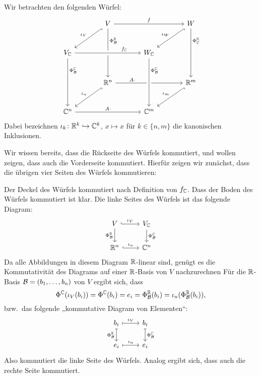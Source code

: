 \documentclass[a4paper,10pt]{article}
\begin{document}
Wir betrachten den folgenden Würfel:
\[
  \begin{tikzcd}[row sep = large, column sep = large]
      {}
    & V
      \arrow[rr, "f"]
      \arrow[ld, hookrightarrow, "\iota_V"']
      \arrow[dd, "\Phi^\Rbb_\mc{B}" near start]
    & 
    & W
      \arrow[ld, hookrightarrow, "\iota_W"']
      \arrow[dd, "\Phi^\Rbb_\mc{C}", near start]
    \\
      V_\Cbb
      \arrow[rr, crossing over, "f_\Cbb" near end]
      \arrow[dd, "\Phi^\Cbb_\mc{B}" near start]
    & 
    & W_\Cbb
    & 
    \\
      {}
    & \Rbb^n
      \arrow[ld, hookrightarrow, "\iota_n"']
      \arrow[rr, "A \cdot" near start]
    & 
    & \Rbb^m
      \arrow[ld, hookrightarrow, "\iota_m"']
    \\
      \Cbb^n
      \arrow[rr, "A \cdot"]
    & 
    & \Cbb^m
      \arrow[from=uu, crossing over, "\Phi^\Cbb_\mc{B}" near start]
    & 
  \end{tikzcd}
\]
Dabei bezeichnen $\iota_k \colon \mathbb{R}^k \hookrightarrow \mathbb{C}^k$, $x \mapsto x$ für $k \in \{n, m\}$ die kanonischen Inklusionen.

Wir wissen bereits, dass die Rückseite des Würfels kommutiert, und wollen zeigen, dass auch die Vorderseite kommutiert.
Hierfür zeigen wir zunächst, dass die übrigen vier Seiten des Würfels kommutieren:

Der Deckel des Würfels kommutiert nach Definition von $f_{\mathbb{C}}$.
Dass der Boden des Würfels kommutiert ist klar.
Die linke Seites des Würfels ist das folgende Diagram:
\[
  \begin{tikzcd}
      V
      \arrow[r, hookrightarrow, "\iota_V"]
      \arrow[d, "\Phi^\Rbb_\mc{B}"']
    & V_\Cbb
      \arrow[d, "\Phi^\Cbb_\mc{B}"]
    \\
      \Rbb^n
      \arrow[r, hookrightarrow, "\iota_n"]
    & \Cbb^n
  \end{tikzcd}
\]
Da alle Abbildungen in diesem Diagram $\mathbb{R}$-linear sind, genügt es die Kommutativität des Diagrams auf einer $\mathbb{R}$-Basis von $V$ nachzurechnen
Für die $\mathbb{R}$-Basis $\mathcal{B} = (b_1, \dotsc, b_n)$ von $V$ ergibt sich, dass
\[
  \Phi^{\mathbb{C}}(\iota_V(b_i))
  = \Phi^{\mathbb{C}}(b_i)
  = e_i
  = \Phi^{\mathbb{R}}_{\mathcal{B}}(b_i)
  = \iota_n(\Phi^{\mathbb{R}}_{\mathcal{B}}(b_i)),
\]
bzw.\ das folgende „kommutative Diagram von Elementen“:
\[
  \begin{tikzcd}
      b_i
      \arrow[r, maps to, "\iota_V"]
      \arrow[d, maps to, "\Phi^\Rbb_\mc{B}"']
    & b_i
      \arrow[d, maps to, "\Phi^\Cbb_\mc{B}"]
    \\
      e_i
      \arrow[r, maps to, "\iota_n"]
    & e_i
  \end{tikzcd}
\]
Also kommutiert die linke Seite des Würfels.
Analog ergibt sich, dass auch die rechte Seite kommutiert.
\end{document}
